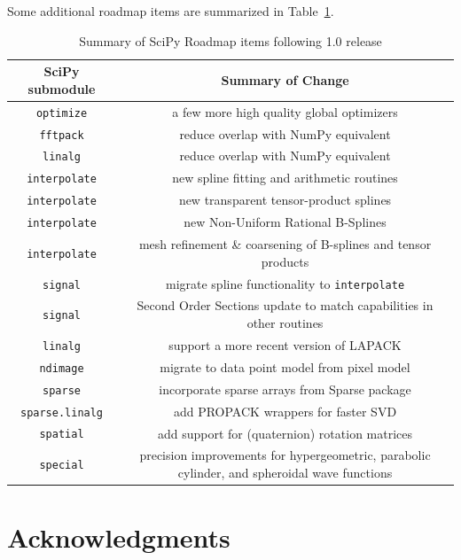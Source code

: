 \documentclass[fleqn,10pt]{wlscirep}
\begin{document}
Some additional roadmap items are summarized in Table~\ref{table:roadmap}.

\begin{table}[H]
\caption{Summary of SciPy Roadmap items following 1.0 release}
\begin{tabular}{ c|c }
    SciPy submodule & Summary of Change \\
    \hline
    \texttt{optimize} & a few more high quality global optimizers\\
    \texttt{fftpack} & reduce overlap with NumPy equivalent \\
    \texttt{linalg} & reduce overlap with NumPy equivalent \\
    \texttt{interpolate} & new spline fitting and arithmetic routines \\
    \texttt{interpolate} & new transparent tensor-product splines\\
    \texttt{interpolate} & new Non-Uniform Rational B-Splines\\
    \texttt{interpolate} & mesh refinement \& coarsening of B-splines and tensor products\\
    \texttt{signal} & migrate spline functionality to \texttt{interpolate}\\
    \texttt{signal} & Second Order Sections update to match capabilities in other routines\\
    \texttt{linalg} & support a more recent version of LAPACK\\
    \texttt{ndimage} & migrate to data point model from pixel model\\
    \texttt{sparse} & incorporate sparse arrays from Sparse package\cite{abbasi2018sparse} \\
    \texttt{sparse.linalg} & add PROPACK wrappers for faster SVD\\
    \texttt{spatial} & add support for (quaternion) rotation matrices\\
    \texttt{special} & precision improvements for hypergeometric, parabolic cylinder, and spheroidal wave functions\\
\end{tabular}\label{table:roadmap}
\end{table}



\section*{Acknowledgments}
\end{document}
